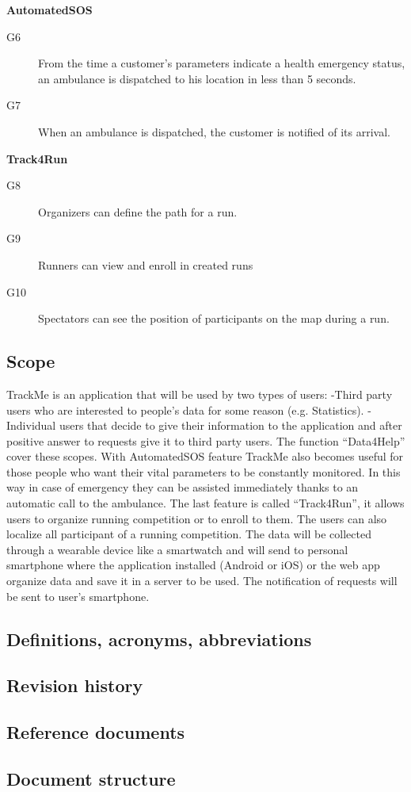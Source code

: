 \documentclass[../main.tex]{subfiles}
\begin{document}
{\bf AutomatedSOS}
\begin{description}
	\item [G6]  From the time a customer's parameters indicate a health emergency status, an ambulance is dispatched to his location in less than 5 seconds.
	\item [G7]  When an ambulance is dispatched, the customer is notified of its arrival.
\end{description}

{\bf Track4Run}
\begin{description}
	\item [G8]  Organizers can define the path for a run.
	\item [G9]  Runners can view and enroll in created runs
	\item [G10] Spectators can see the position of participants on the map during a run.
\end{description}

\subsection{Scope}
TrackMe is an application that will be used by two types of users:
-Third party users who are interested to people’s data for some reason (e.g. Statistics).
-Individual users that decide to give their information to the application and after positive answer to requests give it to third party users.
The function “Data4Help” cover these scopes.
With AutomatedSOS feature TrackMe also becomes useful for those people who want their vital parameters to be constantly monitored. In this way in case of emergency they can be assisted immediately thanks to an automatic call to the ambulance.
The last feature is called “Track4Run”, it allows users to organize running competition or to enroll to them. The users can also localize all participant of a running competition.
The data will be collected through a wearable device like a smartwatch and will send to personal smartphone where the application installed (Android or iOS) or the web app organize data and save it in a server to be used. The notification of requests will be sent to user’s smartphone.
\subsection{Definitions, acronyms, abbreviations}
\subsection{Revision history}
\subsection{Reference documents}
\subsection{Document structure}
\end{document}
